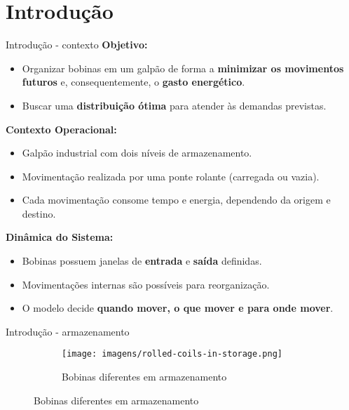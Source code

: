 \section{Introdução}

\begin{frame}{Introdução - contexto}
\textbf{Objetivo:}
\begin{itemize}
    \item Organizar bobinas em um galpão de forma a \textbf{minimizar os movimentos futuros} e, consequentemente, o \textbf{gasto energético}.
    \item Buscar uma \textbf{distribuição ótima} para atender às demandas previstas.
\end{itemize}

\vspace{0.4cm}
\textbf{Contexto Operacional:}
\begin{itemize}
    \item Galpão industrial com dois níveis de armazenamento.
    \item Movimentação realizada por uma ponte rolante (carregada ou vazia).
    \item Cada movimentação consome tempo e energia, dependendo da origem e destino.
\end{itemize}

\vspace{0.4cm}
\textbf{Dinâmica do Sistema:}
\begin{itemize}
    \item Bobinas possuem janelas de \textbf{entrada} e \textbf{saída} definidas.
    \item Movimentações internas são possíveis para reorganização.
    \item O modelo decide \textbf{quando mover, o que mover e para onde mover}.
\end{itemize}
\end{frame}


\begin{frame}{Introdução - armazenamento}
    \begin{figure}
        \begin{figure}
            \centering
            \texttt{[image: imagens/rolled-coils-in-storage.png]}
            \caption{Bobinas diferentes em armazenamento}
            \label{fig:bobinas-armazenamento}
        \end{figure}
    \end{figure}
\end{frame}